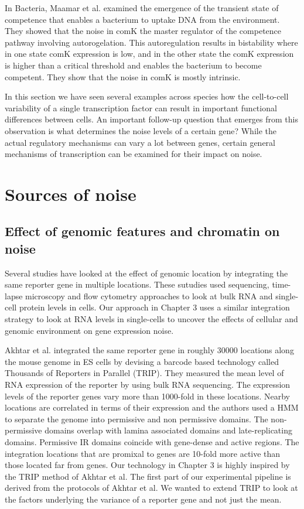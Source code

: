 In Bacteria, Maamar et al. \cite{maamar2007s} examined the emergence of the transient state of competence that enables a bacterium to uptake DNA from the environment. They showed that the noise in comK the master regulator of the competence pathway involving autorogelation. This autoregulation results in bistability where in one state comK expression is low, and in the other state the comK expression is higher than a critical threshold and enables the bacterium to become competent. They show that the noise in comK is mostly intrinsic.

In this section we have seen several examples across species how the cell-to-cell variability of a single transcription factor can result in important functional differences between cells. An important follow-up question that emerges from this observation is what determines the noise levels of a certain gene? While the actual regulatory mechanisms can vary a lot between genes, certain general mechanisms of transcription can be examined for their impact on noise.

\section{Sources of noise}

\subsection{Effect of genomic features and chromatin on noise}

Several studies have looked at the effect of genomic location by integrating the same reporter gene in multiple locations. These sutudies used sequencing, time-lapse microscopy and flow cytometry approaches to look at bulk RNA and single-cell protein levels in cells. Our approach in Chapter 3 uses a similar integration strategy to look at RNA levels in single-cells to uncover the effects of cellular and genomic environment on gene expression noise.

Akhtar et al. \cite{akhtarw_vansteenselb:ChromatinPosition2013} integrated the same reporter gene in roughly 30000 locations along the mouse genome in ES cells by devising a barcode based technology called Thousands of Reporters in Parallel (TRIP). They measured the mean level of RNA expression of the reporter by using bulk RNA sequencing. The expression levels of the reporter genes vary more than 1000-fold in these locations. Nearby locations are correlated in terms of their expression and the authors used a HMM to separate the genome into permissive and non permissive domains. The non-permissive domains overlap with lamina associated domains and late-replicating domains. Permissive IR domains coincide with gene-dense and active regions. The integration locations that are promixal to genes are 10-fold more active than those located far from genes. Our technology in Chapter 3 is highly inspired by the TRIP method of Akhtar et al. The first part of our experimental pipeline is derived from the protocols of Akhtar et al. We wanted to extend TRIP to look at the factors underlying the variance of a reporter gene and not just the mean.

